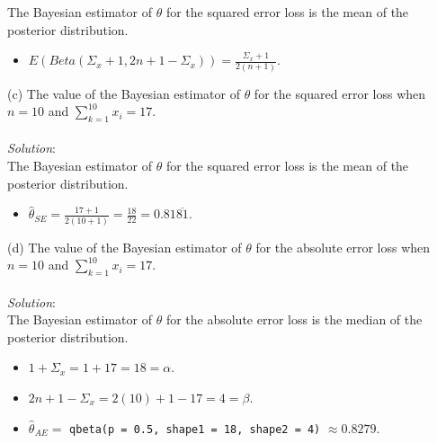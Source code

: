 \documentclass[12pt]{article}
\newcommand{\XBB}{\color{blue}}
\newcommand{\ds}{\displaystyle}
\begin{document}
\noindent
The Bayesian estimator of $ \theta $ for the squared error loss is the mean of the posterior distribution. \\

\begin{itemize}
    \item $ \ds E(Beta(\Sigma_{x} + 1, 2n + 1 - \Sigma_{x})) = \frac{ \Sigma_{x} + 1 }{ 2(n + 1) } $.
\end{itemize}

\newpage

\vspace{2.5mm}

(c) The value of the Bayesian estimator of $ \theta $ for the squared error loss when \\
$ n = 10 $ and $ \sum_{k=1}^{10} x_{i} = 17 $. \\
\vspace{2.5mm} \\
\textit{Solution}:
\vspace{2.5mm} \\

\noindent
The Bayesian estimator of $ \theta $ for the squared error loss is the mean of the posterior distribution. \\

\begin{itemize}
    \item $ \ds \hat{\theta}_{SE} = \frac{ 17 + 1 }{ 2(10 + 1) } = \frac{ 18 }{ 22 } = 0.81\overline{81} $.
\end{itemize}

\vspace{2.5mm}

(d) The value of the Bayesian estimator of $ \theta $ for the absolute error loss when \\
$ n = 10 $ and $ \sum_{k=1}^{10} x_{i} = 17 $. \\
\vspace{2.5mm} \\
\textit{Solution}:
\vspace{2.5mm} \\

\noindent
The Bayesian estimator of $ \theta $ for the absolute error loss is the median of the posterior distribution. \\

\begin{itemize}
    \item $ \ds 1 + \Sigma_{x} = 1 + 17 = 18 = \alpha $.
    \item $ \ds 2n + 1 - \Sigma_{x} = 2(10) + 1 - 17 = 4 = \beta $.
    \item $ \ds \hat{\theta}_{AE} = $ {\XBB \texttt{qbeta(p = 0.5, shape1 = 18, shape2 = 4)}} $ \approx 0.8279 $.
\end{itemize}
\end{document}
